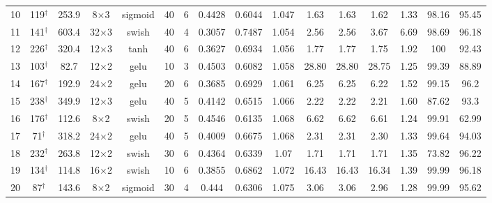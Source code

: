 \begin{tabular}{lcc cccc ccccccc cc}
  10 & 119$^\dagger$ & 253.9 & 8$\times$3 & sigmoid & 40 & 6 & \num{0.4428} & \num{0.6044} & \num{1.047} & 1.63 & 1.63 & 1.62 & 1.33 & \num{98.16} & \num{95.45} \\
  11 & 141$^\dagger$ & 603.4 & 32$\times$3 & swish & 40 & 4 & \num{0.3057} & \num{0.7487} & \num{1.054} & 2.56 & 2.56 & 3.67 & 6.69 & \num{98.69} & \num{96.18} \\
  12 & 226$^\dagger$ & 320.4 & 12$\times$3 & tanh & 40 & 6 & \num{0.3627} & \num{0.6934} & \num{1.056} & 1.77 & 1.77 & 1.75 & 1.92 & \num{100} & \num{92.43} \\
  13 & 103$^\dagger$ & 82.7 & 12$\times$2 & gelu & 10 & 3 & \num{0.4503} & \num{0.6082} & \num{1.058} & 28.80 & 28.80 & 28.75 & 1.25 & \num{99.39} & \num{88.89} \\
  14 & 167$^\dagger$ & 192.9 & 24$\times$2 & gelu & 20 & 6 & \num{0.3685} & \num{0.6929} & \num{1.061} & 6.25 & 6.25 & 6.22 & 1.52 & \num{99.15} & \num{96.2} \\
  15 & 238$^\dagger$ & 349.9 & 12$\times$3 & gelu & 40 & 5 & \num{0.4142} & \num{0.6515} & \num{1.066} & 2.22 & 2.22 & 2.21 & 1.60 & \num{87.62} & \num{93.3} \\
  16 & 176$^\dagger$ & 112.6 & 8$\times$2 & swish & 20 & 5 & \num{0.4546} & \num{0.6135} & \num{1.068} & 6.62 & 6.62 & 6.61 & 1.24 & \num{99.91} & \num{62.99} \\
  17 & 71$^\dagger$ & 318.2 & 24$\times$2 & gelu & 40 & 5 & \num{0.4009} & \num{0.6675} & \num{1.068} & 2.31 & 2.31 & 2.30 & 1.33 & \num{99.64} & \num{94.03} \\
  18 & 232$^\dagger$ & 263.8 & 12$\times$2 & swish & 30 & 6 & \num{0.4364} & \num{0.6339} & \num{1.07} & 1.71 & 1.71 & 1.71 & 1.35 & \num{73.82} & \num{96.22} \\
  19 & 134$^\dagger$ & 114.8 & 16$\times$2 & swish & 10 & 6 & \num{0.3855} & \num{0.6862} & \num{1.072} & 16.43 & 16.43 & 16.34 & 1.39 & \num{99.99} & \num{96.18} \\
  20 & 87$^\dagger$ & 143.6 & 8$\times$2 & sigmoid & 30 & 4 & \num{0.444} & \num{0.6306} & \num{1.075} & 3.06 & 3.06 & 2.96 & 1.28 & \num{99.99} & \num{95.62} \\
\bottomrule
\end{tabular}

